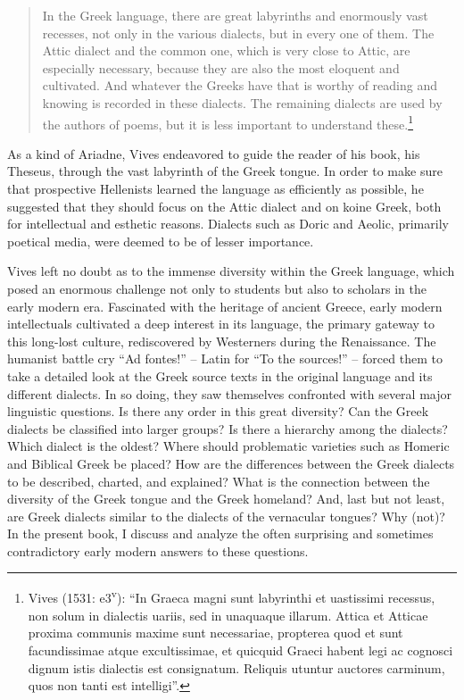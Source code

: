 \documentclass[output=paper]{langsci/langscibook}
\begin{document}
\begin{quote}
In the Greek language, there are great labyrinths and enormously vast recesses, not only in the various dialects, but in every one of them. The Attic dialect and the common one, which is very close to Attic, are especially necessary, because they are also the most eloquent and cultivated. And whatever the Greeks have that is worthy of reading and knowing is recorded in these dialects. The remaining dialects are used by the authors of poems, but it is less important to understand these.\footnote{Vives (1531: e3\textsuperscript{v}): “In Graeca magni sunt labyrinthi et uastissimi recessus, non solum in dialectis uariis, sed in unaquaque illarum. Attica et Atticae proxima communis maxime sunt necessariae, propterea quod et sunt facundissimae atque excultissimae, et quicquid Graeci habent legi ac cognosci dignum istis dialectis est consignatum. Reliquis utuntur auctores carminum, quos non tanti est intelligi”.}
\end{quote}

As a kind of Ariadne, Vives endeavored to guide the reader of his book, his Theseus, through the vast labyrinth of the Greek tongue. In order to make sure that prospective Hellenists learned the language as efficiently as possible, he suggested that they should focus on the Attic dialect and on koine Greek, both for intellectual and esthetic reasons. Dialects such as Doric and Aeolic, primarily poetical media, were deemed to be of lesser importance.

Vives left no doubt as to the immense diversity within the Greek language, which posed an enormous challenge not only to students but also to scholars in the early modern era. Fascinated with the heritage of ancient Greece, early modern intellectuals cultivated a deep interest in its language, the primary gateway to this long-lost culture, rediscovered by Westerners during the Renaissance. The humanist battle cry “Ad fontes!” – Latin for “To the sources!” – forced them to take a detailed look at the Greek source texts in the original language and its different dialects. In so doing, they saw themselves confronted with several major linguistic questions. Is there any order in this great diversity? Can the Greek dialects be classified into larger groups? Is there a hierarchy among the dialects? Which dialect is the oldest? Where should problematic varieties such as Homeric and Biblical Greek be placed? How are the differences between the Greek dialects to be described, charted, and explained? What is the connection between the diversity of the Greek tongue and the Greek homeland? And, last but not least, are Greek dialects similar to the dialects of the vernacular tongues? Why (not)? In the present book, I discuss and analyze the often surprising and sometimes contradictory early modern answers to these questions.
\end{document}
